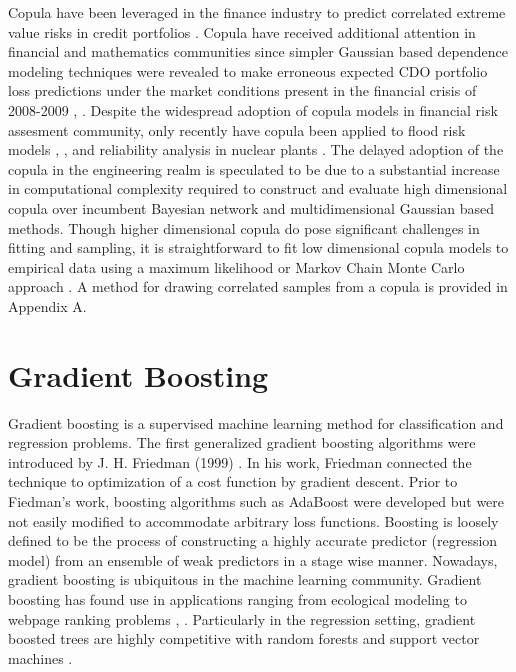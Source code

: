 Copula have been leveraged in the finance industry to
predict correlated extreme value risks in credit portfolios
\cite{Geidosch2016}.  Copula have received additional attention in financial and mathematics communities since 
simpler Gaussian based dependence modeling techniques were revealed to make erroneous expected CDO portfolio loss predictions under the market conditions present in the financial crisis of
2008-2009 \cite{MacKenzie2013}, \cite{Li2000}.  Despite the widespread adoption of copula models in financial risk assesment community, only recently have copula been applied to flood risk
models \cite{Dupuis2007}, \cite{Ganguli2012}, and reliability analysis in nuclear plants
\cite{Kelly2007}.  The delayed adoption of the copula in the
engineering realm is speculated to be due to a substantial increase in computational
complexity required to construct and evaluate high dimensional copula over
incumbent Bayesian network and multidimensional Gaussian based methods.  
Though higher dimensional copula do pose significant challenges in fitting and sampling, it is straightforward to fit low dimensional copula models to empirical data
using a maximum likelihood or Markov Chain Monte Carlo approach \cite{Jouini1996}.
A method for drawing correlated samples from a copula is provided in Appendix A.

\section{Gradient Boosting}

Gradient boosting is a supervised machine learning method for classification and regression problems.
The first generalized gradient boosting algorithms were introduced by J. H. Friedman (1999) \cite{friedman2001}.  In his work, Friedman connected the technique to optimization of a cost function by gradient descent.  Prior to Fiedman's work, boosting algorithms such as AdaBoost were developed but were not easily modified to accommodate arbitrary loss functions.  Boosting is loosely defined to be the process of constructing a highly accurate predictor (regression model) from an ensemble of weak predictors in a stage wise manner.
Nowadays, gradient boosting is ubiquitous in the machine learning community.  Gradient boosting has found use in applications ranging from ecological modeling \cite{death2007} to webpage ranking problems \cite{Tyree2011}, \cite{chapelle2011}.  Particularly in the regression setting, gradient boosted trees are highly competitive with random forests and support vector machines \cite{moisen2006}.


